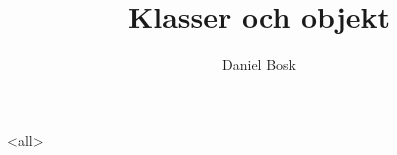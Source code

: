 \documentclass[ignoreframetext]{beamer}
\begin{document}
\title{%
  Klasser och objekt
}
\author{Daniel Bosk}

\begin{frame}
  \maketitle
\end{frame}

\mode<all>

\mode*

\begin{frame}[allowframebreaks]
  \printbibliography
\end{frame}
\end{document}
